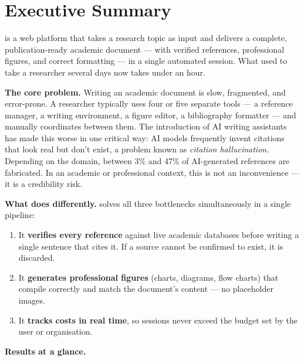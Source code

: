 \section*{Executive Summary}

\begin{keybox}[title=What is Perricheno?]
\sys{} is a web platform that takes a research topic as input and delivers a
complete, publication-ready academic document — with verified references, professional
figures, and correct formatting — in a single automated session.
What used to take a researcher several days now takes under an hour.
\end{keybox}

\vspace{0.5em}

\textbf{The core problem.}
Writing an academic document is slow, fragmented, and error-prone.
A researcher typically uses four or five separate tools — a reference manager,
a writing environment, a figure editor, a bibliography formatter — and manually
coordinates between them.
The introduction of AI writing assistants has made this worse in one critical way:
AI models frequently invent citations that look real but don't exist,
a problem known as \emph{citation hallucination}.
Depending on the domain, between 3\% and 47\% of AI-generated references are fabricated.
In an academic or professional context, this is not an inconvenience — it is a credibility risk.

\textbf{What \sys{} does differently.}
\sys{} solves all three bottlenecks simultaneously in a single pipeline:

\begin{enumerate}
  \item It \textbf{verifies every reference} against live academic databases before
        writing a single sentence that cites it.
        If a source cannot be confirmed to exist, it is discarded.
  \item It \textbf{generates professional figures} (charts, diagrams, flow charts)
        that compile correctly and match the document's content — no placeholder images.
  \item It \textbf{tracks costs in real time}, so sessions never exceed the budget
        set by the user or organisation.
\end{enumerate}

\textbf{Results at a glance.}

